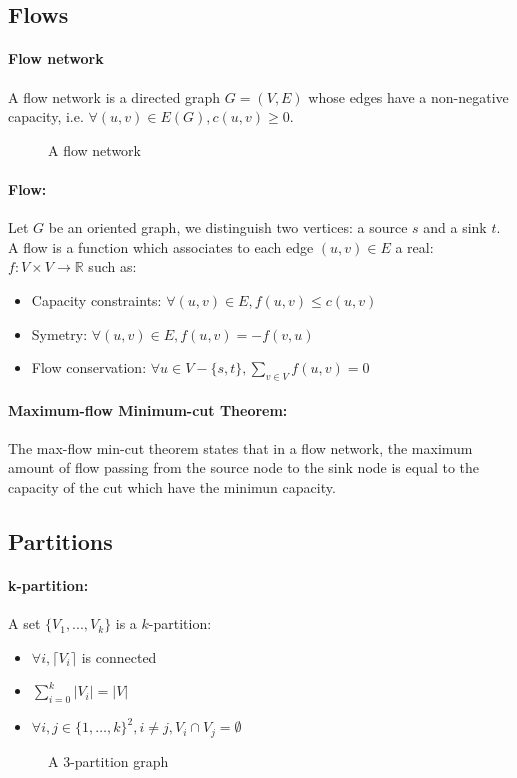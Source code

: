\subsection{Flows}
\paragraph{Flow network}
A flow network is a directed graph $G=(V,E)$ whose edges have a non-negative
capacity, i.e. $\forall (u,v) \in E(G), c(u,v) \geq 0$.

\begin{figure}[!h]
  \begin{center}
    
  \end{center}
  \caption{A flow network}
\end{figure}

\paragraph{Flow:}
Let $G$ be an oriented graph, we distinguish two vertices: a source $s$ and a
sink $t$.
A flow is a function which associates to each edge $(u,v) \in E$ a real:
$f: V \times V \rightarrow \mathbb{R}$ such as:
\begin{itemize}
    \item Capacity constraints: $\forall (u,v) \in E, f(u,v) \leq c(u,v)$
    \item Symetry: $\forall (u,v) \in E, f(u,v) = - f(v,u) $
    \item Flow conservation: $\forall u \in V - \{s,t\}, \sum_{v \in V}f(u,v) = 0$ 
\end{itemize}


\paragraph{Maximum-flow Minimum-cut Theorem:}
The max-flow min-cut theorem states that in a flow network, the maximum amount
of flow passing from the source node to the sink node is equal to the capacity
of the cut which have the minimun capacity.

\subsection{Partitions}
\paragraph{k-partition:}
A set $\{V_1,...,V_k\}$ is a $k$-partition:
\begin{itemize}
    \item $\forall i, \lceil V_i \rceil$ is connected
    \item $\sum\limits_{i=0}^k|V_i| = |V|$
    \item $\forall i,j \in \{1, \dots, k\}^2, i \neq j, V_i \cap V_j = \emptyset$
\end{itemize}

\begin{figure}[!h]
    \begin{center}
        
    \end{center}
    \caption{A 3-partition graph}
\end{figure}


